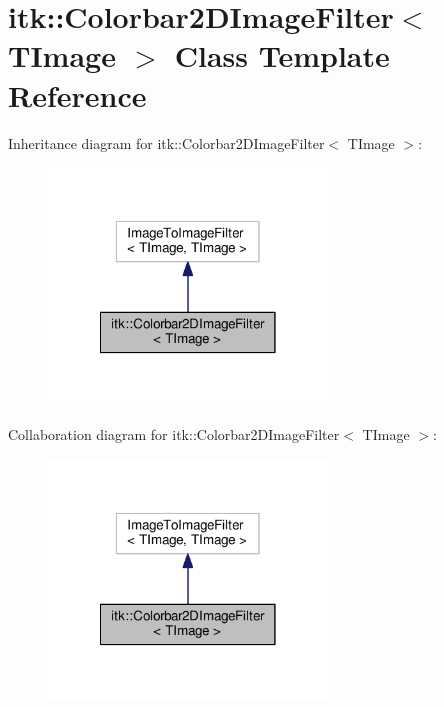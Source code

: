 \hypertarget{classitk_1_1_colorbar2_d_image_filter}{\section{itk\-:\-:Colorbar2\-D\-Image\-Filter$<$ T\-Image $>$ Class Template Reference}
\label{classitk_1_1_colorbar2_d_image_filter}
}


Inheritance diagram for itk\-:\-:Colorbar2\-D\-Image\-Filter$<$ T\-Image $>$\-:
\nopagebreak
\begin{figure}[H]
\begin{center}
\leavevmode
\includegraphics[width=210pt]{classitk_1_1_colorbar2_d_image_filter__inherit__graph}
\end{center}
\end{figure}


Collaboration diagram for itk\-:\-:Colorbar2\-D\-Image\-Filter$<$ T\-Image $>$\-:
\nopagebreak
\begin{figure}[H]
\begin{center}
\leavevmode
\includegraphics[width=210pt]{classitk_1_1_colorbar2_d_image_filter__coll__graph}
\end{center}
\end{figure}
